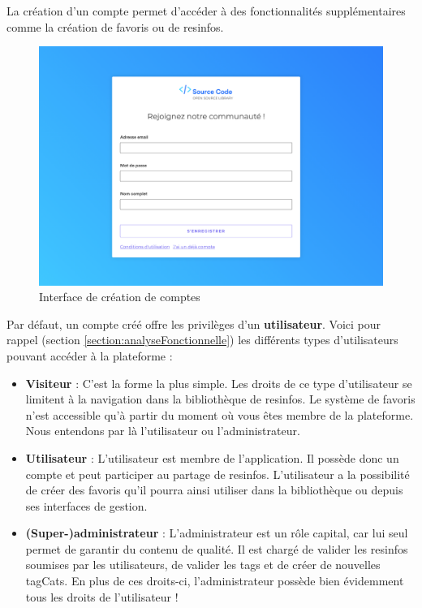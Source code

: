 La création d'un compte permet d'accéder à des fonctionnalités supplémentaires comme la création de favoris ou de \glspl{resinfo}.\\

\begin{figure}[H]
    \includegraphics[width=\textwidth,height=0.35\textheight,keepaspectratio]{images/client/register.png}
    \centering
    \caption[SourceCode : interface de création de comptes]{Interface de création de comptes}
\end{figure}

Par défaut, un compte créé offre les privilèges d'un \textbf{utilisateur}. Voici pour rappel (section \ref{section:analyseFonctionnelle}) les différents types d'utilisateurs pouvant accéder à la plateforme :

\begin{itemize}
    \item \textbf{Visiteur} : C'est la forme la plus simple. Les droits de ce type d'utilisateur se limitent à la navigation dans la bibliothèque de \glspl{resinfo}. Le système de favoris n'est accessible qu'à partir du moment où vous êtes membre de la plateforme. Nous entendons par là l'utilisateur ou l'administrateur.
    \item \textbf{Utilisateur} : L'utilisateur est membre de l'application. Il possède donc un compte et peut participer au partage de \glspl{resinfo}. L'utilisateur a la possibilité de créer des favoris qu'il pourra ainsi utiliser dans la bibliothèque ou depuis ses interfaces de gestion.
    \item \textbf{(Super-)administrateur} : L'administrateur est un rôle capital, car lui seul permet de garantir du contenu de qualité. Il est chargé de valider les \glspl{resinfo} soumises par les utilisateurs, de valider les \glspl{tag} et de créer de nouvelles \glspl{tagCat}. En plus de ces droits-ci, l'administrateur possède bien évidemment tous les droits de l'utilisateur !
\end{itemize}


